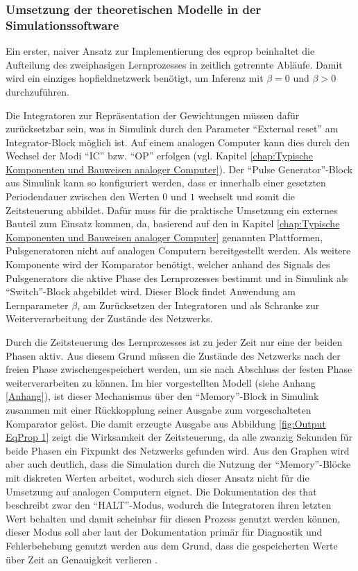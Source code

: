 \subsubsection{Umsetzung der theoretischen Modelle in der Simulationssoftware}
\label{chap:Umsetzung der theoretischen Modelle in der Simulationssoftware}

Ein erster, naiver Ansatz zur Implementierung des \gls{eqprop} beinhaltet die Aufteilung des zweiphasigen Lernprozesses in zeitlich getrennte Abläufe. Damit wird ein einziges \gls{hopfieldnetzwerk} benötigt, um Inferenz mit \(\beta=0\) und \(\beta>0\) durchzuführen.

Die Integratoren zur Repräsentation der Gewichtungen müssen dafür zurücksetzbar sein, was in Simulink durch den Parameter "`External reset"' am Integrator-Block möglich ist. Auf einem analogen Computer kann dies durch den Wechsel der Modi "`IC"' bzw. "`OP"' erfolgen (vgl. Kapitel \ref{chap:Typische Komponenten und Bauweisen analoger Computer}). Der "`Pulse Generator"'-Block aus Simulink kann so konfiguriert werden, dass er innerhalb einer gesetzten Periodendauer zwischen den Werten \(0\) und \(1\) wechselt und somit die Zeitsteuerung abbildet. Dafür muss für die praktische Umsetzung ein externes Bauteil zum Einsatz kommen, da, basierend auf den in Kapitel \ref{chap:Typische Komponenten und Bauweisen analoger Computer} genannten Plattformen, Pulsgeneratoren nicht auf analogen Computern bereitgestellt werden. Als weitere Komponente wird der Komparator benötigt, welcher anhand des Signals des Pulsgenerators die aktive Phase des Lernprozesses bestimmt und in Simulink als "`Switch"'-Block abgebildet wird. Dieser Block findet Anwendung am Lernparameter \(\beta\), am Zurücksetzen der Integratoren und als Schranke zur Weiterverarbeitung der Zustände des Netzwerks.

Durch die Zeitsteuerung des Lernprozesses ist zu jeder Zeit nur eine der beiden Phasen aktiv. Aus diesem Grund müssen die Zustände des Netzwerks nach der freien Phase zwischengespeichert werden, um sie nach Abschluss der festen Phase weiterverarbeiten zu können. Im hier vorgestellten Modell (siehe Anhang \ref{Anhang}), ist dieser Mechanismus über den "`Memory"'-Block in Simulink zusammen mit einer Rückkopplung seiner Ausgabe zum vorgeschalteten Komparator gelöst. Die damit erzeugte Ausgabe aus Abbildung \ref{fig:Output EqProp 1} zeigt die Wirksamkeit der Zeitsteuerung, da alle zwanzig Sekunden für beide Phasen ein Fixpunkt des Netzwerks gefunden wird. Aus den Graphen wird aber auch deutlich, dass die Simulation durch die Nutzung der "`Memory"'-Blöcke mit diskreten Werten arbeitet, wodurch sich dieser Ansatz nicht für die Umsetzung auf analogen Computern eignet. Die Dokumentation des \ac{that} beschreibt zwar den "`HALT"'-Modus, wodurch die Integratoren ihren letzten Wert behalten und damit scheinbar für diesen Prozess genutzt werden können, dieser Modus soll aber laut der Dokumentation primär für Diagnostik und Fehlerbehebung genutzt werden \ua aus dem Grund, dass die gespeicherten Werte über Zeit an Genauigkeit verlieren \cite[vgl.]{TheAnalogThingDocs}.

